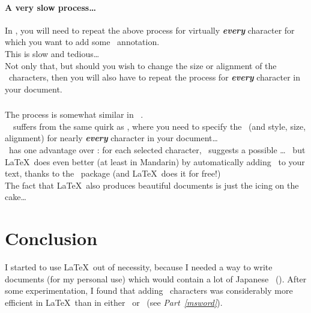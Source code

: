 \subsection*{A very slow process\dots} \label{slow-process}

In \LibreOffice, you will need to repeat the above process for virtually \textbf{\emph{every}} character for which you want to add some \rruby\ annotation. \\
	
This is slow and tedious\dots \\
	
Not only that, but should you wish to change the size or alignment of the \rruby\ characters, then you will also have to repeat the process for  \textbf{\emph{every}} character in your document. \\



\section*{\Word}

The process is somewhat similar in \Microsoft\ \Word. \\

\Microsoft\ \Word\ suffers from the same quirk as \LibreOffice, where you need to specify the \rruby\ (and style, size, alignment) for nearly \textbf{\emph{every}} character in your document\dots \\

\Word\ has one advantage over \LibreOffice: for each selected character, \Word\ suggests a possible \rruby\dots
\ but \LaTeX\ does even better (at least in Mandarin) by automatically adding \ppinyin\ to your text, thanks to the \xxpinyin\ package (and \LaTeX\ does it for free!) \\

The fact that \LaTeX\ also produces beautiful documents is just the icing on the cake\dots


\newpage

\renewcommand{\currentPart}{Conclusion}

\part{\currentPart}

I started to use \LaTeX\ out of necessity, because I needed a way to write documents (for my personal use) which would contain a lot of Japanese \furigana\ (\rruby).
After some experimentation, I found that adding \rruby\ characters was considerably more efficient in \LaTeX\ than in either \LibreOffice\ or \Word\ (see \emph{Part~\ref{msword}}). \\

